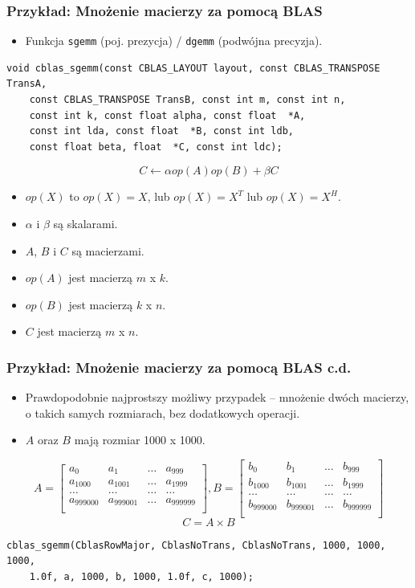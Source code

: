 \documentclass[dvipsnames,table]{beamer}
\begin{document}
\begin{frame}[fragile]
\frametitle{Przykład: Mnożenie macierzy za pomocą  BLAS}
\begin{itemize}
	\item Funkcja {\tt sgemm} (poj. prezycja) / {\tt dgemm} (podwójna precyzja).
\end{itemize}
\begin{lstlisting}
void cblas_sgemm(const CBLAS_LAYOUT layout, const CBLAS_TRANSPOSE TransA,
	const CBLAS_TRANSPOSE TransB, const int m, const int n,
	const int k, const float alpha, const float  *A,
	const int lda, const float  *B, const int ldb,
	const float beta, float  *C, const int ldc);
\end{lstlisting}
\[ C \leftarrow \alpha op(A) op(B) + \beta C \]
\begin{itemize}
	\item $op(X)$ to $op(X) = X$, lub $op(X) = X^T$ lub $op(X) = X^H$.
	\item $\alpha$ i $\beta$ są skalarami.
	\item $A$, $B$ i $C$ są macierzami.
	\item $op(A)$ jest macierzą $m$ x $k$.
	\item $op(B)$ jest macierzą $k$ x $n$.
	\item $C$ jest macierzą $m$ x $n$.
\end{itemize}
\end{frame}

\begin{frame}[fragile]
	\frametitle{Przykład: Mnożenie macierzy za pomocą BLAS c.d.}
\begin{itemize}
	\item Prawdopodobnie najprostszy możliwy przypadek -- mnożenie dwóch macierzy, o takich samych rozmiarach, bez dodatkowych operacji. 
	\item $A$ oraz $B$ mają rozmiar 1000 x 1000.
\end{itemize}
\scriptsize
\[
A =
\begin{bmatrix}
	a_{0} & a_{1} & \dots & a_{999} \\
	a_{1000} & a_{1001} & \dots & a_{1999} \\
	\dots & \dots & \dots & \dots \\
	a_{999000} & a_{999001} & \dots & a_{999999} \\
\end{bmatrix}
, B = 
\begin{bmatrix}
	b_{0} & b_{1} & \dots & b_{999} \\
	b_{1000} & b_{1001} & \dots & b_{1999} \\
	\dots & \dots & \dots & \dots \\
	b_{999000} & b_{999001} & \dots & b_{999999} \\
\end{bmatrix}
\]
\[
C = A \times B
\]
\normalsize
\begin{lstlisting}
cblas_sgemm(CblasRowMajor, CblasNoTrans, CblasNoTrans, 1000, 1000, 1000,
	1.0f, a, 1000, b, 1000, 1.0f, c, 1000);
\end{lstlisting}
\end{frame}
\end{document}

